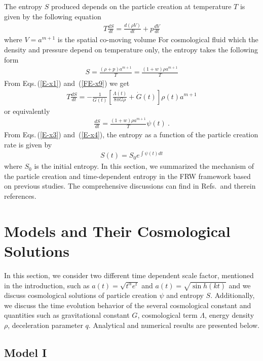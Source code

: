 \documentclass[superscriptaddress,showpacs,pre,twocolumn]{revtex4-1}
\begin{document}
The entropy $S$ produced depends on the particle creation at temperature $T$ is given by the following equation
\begin{eqnarray} \label{E-x1}
T \frac{dS}{dt} = \frac{d(\rho V)}{dt} + p \frac{dV}{dt}
\end{eqnarray}
where $V=a^{m+1}$ is the spatial co-moving volume For cosmological fluid which the density and pressure depend on temperature only, the entropy takes the following form
\begin{eqnarray} \label{E-x2}
S = \frac{(\rho + p) a^{m+1}}{T} = \frac{(1+w) \rho a^{m+1}}{T}
\end{eqnarray}
From Eqs.\,(\ref{E-x1}) and \,(\ref{FE-x9}) we get
\begin{eqnarray}\label{E-x3}
T \frac{dS}{dt} = - \frac{1}{G(t)} \left[ \frac{\dot{\Lambda(t)}}{8\pi G \rho} + \dot{G}(t)  \right] \rho(t) a^{m+1}
\end{eqnarray}
or equivalently
\begin{eqnarray}\label{E-x4}
\frac{dS}{dt} = \frac{(1+w) \rho a^{m+1}}{T} \psi(t) \ .
\end{eqnarray}
From Eqs.\,(\ref{E-x3}) and \,(\ref{E-x4}), the entropy as a function of the particle creation rate is given by
\begin{eqnarray}\label{E-x5}
S(t) = S_{0} e^{\int\psi(t) dt}  
\end{eqnarray}
where $S_{0}$ is the initial entropy. In this section, we summarized the mechanism of the particle creation and time-dependent entropy in the FRW framework based on previous studies. The comprehensive discussions can find in Refs.\,\cite{Prigogine1988,Prigogine1989,xHarko1999,xLima1990} and therein references.

\section{Models and Their Cosmological Solutions}

In this section, we consider two different time dependent scale factor, mentioned in the introduction, such as $a(t)=\sqrt{t^{\alpha}e^{t}}$ and $a(t)=\sqrt{\sin h(kt)}$ and we discuss cosmological solutions of particle creation $\psi$ and entropy $S$. Additionally, we discuss the time evolution behavior of the several cosmological constant and quantities such as gravitational constant $G$, cosmological term $\Lambda$, energy density $\rho$, deceleration parameter $q$. Analytical and numerical results are presented below.


\subsection{Model I}
\end{document}
